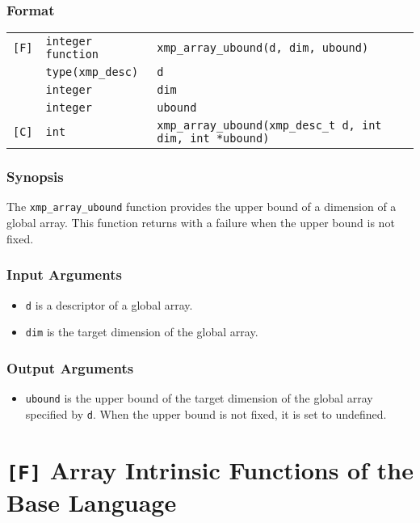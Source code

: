 \subsubsection*{Format}

\begin{tabular}{lll}

\verb![F]!& {\tt integer function}& {\tt xmp\_array\_ubound(d, dim, ubound)}\\
          & {\tt type(xmp\_desc)} & {\tt d}\\
          & {\tt integer} & {\tt dim}\\
          & {\tt integer} & {\tt ubound}\\

\verb![C]!&  {\tt int}& {\tt xmp\_array\_ubound(xmp\_desc\_t d, int dim, int *ubound)}\\

\end{tabular}

\subsubsection*{Synopsis}

The {\tt xmp\_array\_ubound} function provides the upper bound of a
dimension of a global array. This function returns with a failure when the
upper bound is not fixed.

\subsubsection*{Input Arguments}
\begin{itemize}
 \item {\tt d} is a descriptor of a global array.
 \item {\tt dim} is the target dimension of the global array.
\end{itemize}

\subsubsection*{Output Arguments}
\begin{itemize}
 \item {\tt ubound} is the upper bound of the target dimension of the
       global array specified by {\tt d}. When the upper bound is not
       fixed, it is set to undefined.
\end{itemize}

\section{{\tt [F]} Array Intrinsic Functions of the Base Language}


